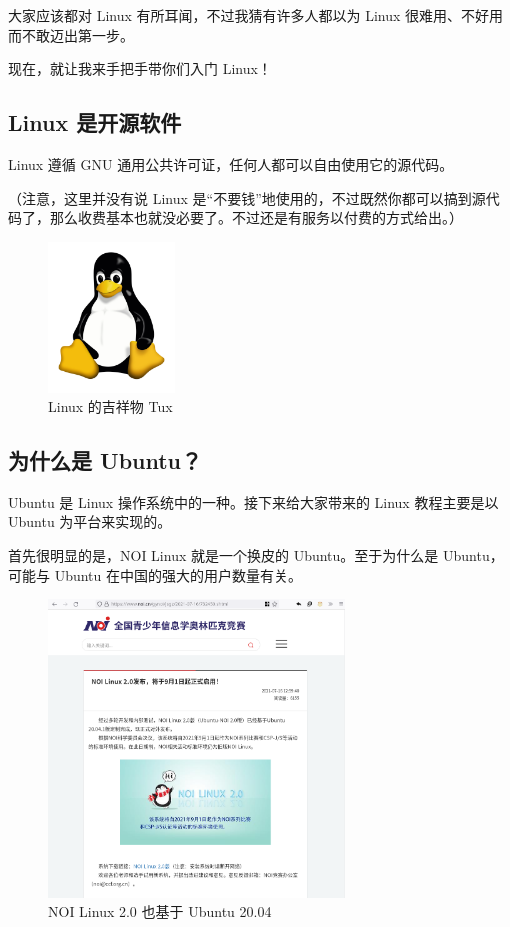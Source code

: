 \documentclass[UTF-8]{ctexart}
\begin{document}
		大家应该都对 Linux 有所耳闻，不过我猜有许多人都以为 Linux 很难用、不好用而不敢迈出第一步。
		
		现在，就让我来手把手带你们入门 Linux！
	
		\subsection{Linux 是开源软件}
		
			Linux 遵循 GNU 通用公共许可证，任何人都可以自由使用它的源代码。
			
			（注意，这里并没有说 Linux 是“不要钱”地使用的，不过既然你都可以搞到源代码了，那么收费基本也就没必要了。不过还是有服务以付费的方式给出。）
			
			\begin{figure}[H]
				\centering
				\includegraphics[width=0.3\textwidth]{fig/tux.png}
				\caption*{Linux 的吉祥物 Tux}
			\end{figure}
			
		\subsection{为什么是 Ubuntu？}
		
			Ubuntu 是 Linux 操作系统中的一种。接下来给大家带来的 Linux 教程主要是以 Ubuntu 为平台来实现的。
		
			首先很明显的是，NOI Linux 就是一个换皮的 Ubuntu。至于为什么是 Ubuntu，可能与 Ubuntu 在中国的强大的用户数量有关。
			
			\begin{figure}[H]
				\centering
				\includegraphics[width=0.7\textwidth]{fig/new_noilinux.png}
				\caption*{NOI Linux 2.0 也基于 Ubuntu 20.04}
			\end{figure}
			
\end{document}
